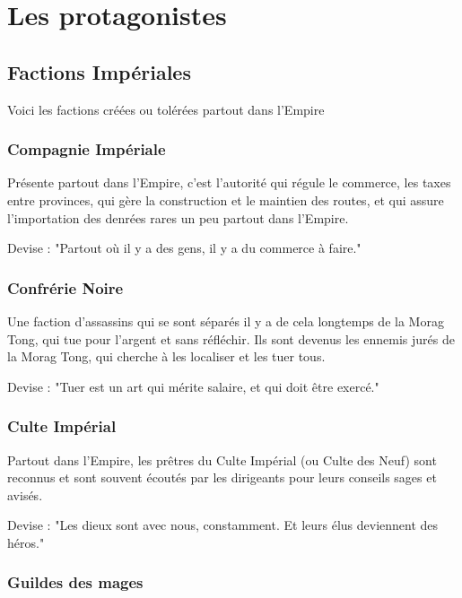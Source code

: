 \chapter{Les protagonistes}

  \section{Factions Impériales}
  
    Voici les factions créées ou tolérées partout dans l'Empire
    
    \subsection{Compagnie Impériale}
    
      Présente partout dans l'Empire, c'est l'autorité qui régule le commerce, les taxes entre provinces, qui gère la construction et le maintien des routes, et qui assure l'importation des denrées rares un peu partout dans l'Empire.
      
      Devise : "Partout où il y a des gens, il y a du commerce à faire."
      
    \subsection{Confrérie Noire}
    
      Une faction d'assassins qui se sont séparés il y a de cela longtemps de la Morag Tong, qui tue pour l'argent et sans réfléchir. Ils sont devenus les ennemis jurés de la Morag Tong, qui cherche à les localiser et les tuer tous.
      
      Devise : "Tuer est un art qui mérite salaire, et qui doit être exercé."
  
    \subsection{Culte Impérial}

      Partout dans l'Empire, les prêtres du Culte Impérial (ou Culte des Neuf) sont reconnus et sont souvent écoutés par les dirigeants pour leurs conseils sages et avisés.
      
      Devise : "Les dieux sont avec nous, constamment. Et leurs élus deviennent des héros."

    \subsection{Guildes des mages}
    
